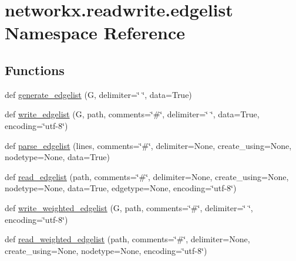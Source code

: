 \hypertarget{namespacenetworkx_1_1readwrite_1_1edgelist}{}\section{networkx.\+readwrite.\+edgelist Namespace Reference}
\label{namespacenetworkx_1_1readwrite_1_1edgelist}
\subsection*{Functions}
\begin{DoxyCompactItemize}
\item 
def \hyperlink{namespacenetworkx_1_1readwrite_1_1edgelist_a0439001b02316865d00e760b38c943b5}{generate\+\_\+edgelist} (G, delimiter=\char`\"{} \char`\"{}, data=True)
\item 
def \hyperlink{namespacenetworkx_1_1readwrite_1_1edgelist_a9def4119e2b369f6a20e221948d97ed7}{write\+\_\+edgelist} (G, path, comments=\char`\"{}\#\char`\"{}, delimiter=\char`\"{} \char`\"{}, data=True, encoding=\char`\"{}utf-\/8\char`\"{})
\item 
def \hyperlink{namespacenetworkx_1_1readwrite_1_1edgelist_a53a72911992f02c936d1f3250f8e7d87}{parse\+\_\+edgelist} (lines, comments=\char`\"{}\#\char`\"{}, delimiter=None, create\+\_\+using=None, nodetype=None, data=True)
\item 
def \hyperlink{namespacenetworkx_1_1readwrite_1_1edgelist_a73553526045da6246d59f2669da6fccb}{read\+\_\+edgelist} (path, comments=\char`\"{}\#\char`\"{}, delimiter=None, create\+\_\+using=None, nodetype=None, data=True, edgetype=None, encoding=\char`\"{}utf-\/8\char`\"{})
\item 
def \hyperlink{namespacenetworkx_1_1readwrite_1_1edgelist_aec8fad11085af20f29bb96017440a0c0}{write\+\_\+weighted\+\_\+edgelist} (G, path, comments=\char`\"{}\#\char`\"{}, delimiter=\char`\"{} \char`\"{}, encoding=\char`\"{}utf-\/8\char`\"{})
\item 
def \hyperlink{namespacenetworkx_1_1readwrite_1_1edgelist_a2c920d87b2b9d8693d078d35bf8be19d}{read\+\_\+weighted\+\_\+edgelist} (path, comments=\char`\"{}\#\char`\"{}, delimiter=None, create\+\_\+using=None, nodetype=None, encoding=\char`\"{}utf-\/8\char`\"{})
\end{DoxyCompactItemize}


